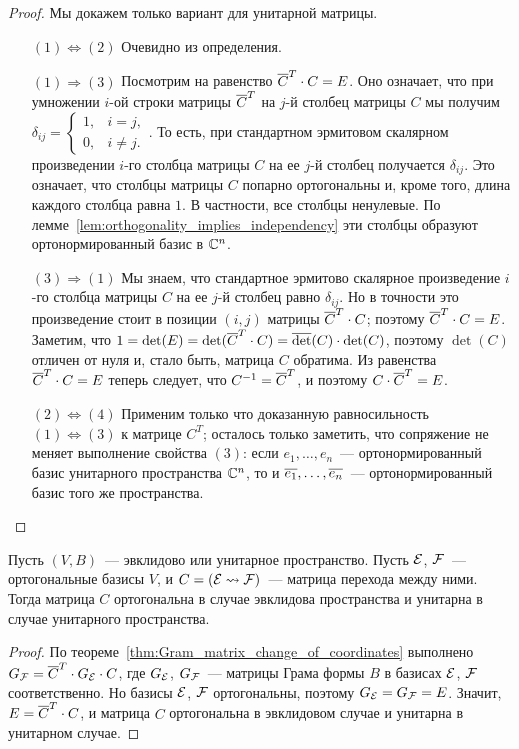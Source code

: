 \begin{proof}
Мы докажем только вариант для унитарной матрицы.
\begin{itemize}
\item[$(1)\Leftrightarrow (2)$] Очевидно из определения.
\item[$(1)\Rightarrow (3)$] Посмотрим на равенство $\overline{C}^T\cdot
  C=E$. Оно означает, что при умножении $i$-ой строки матрицы
  $\overline{C}^T$ на $j$-й столбец матрицы $C$ мы получим
  $\delta_{ij} = \begin{cases}1,&i=j,\\0,&i\neq j.\end{cases}$. То
  есть, при стандартном эрмитовом скалярном произведении $i$-го
  столбца матрицы $C$ на ее $j$-й столбец получается $\delta_{ij}$. Это
  означает, что столбцы матрицы $C$ попарно ортогональны и, кроме того,
  длина каждого столбца равна $1$. В частности, все столбцы
  ненулевые. По лемме~\ref{lem:orthogonality_implies_independency} эти
  столбцы образуют ортонормированный базис в $\mathbb C^n$.
\item[$(3)\Rightarrow (1)$] Мы знаем, что стандартное эрмитово
  скалярное произведение $i$-го столбца матрицы $C$ на ее $j$-й
  столбец равно $\delta_{ij}$. Но в точности это произведение стоит в
  позиции $(i,j)$ матрицы $\overline{C}^T\cdot C$; поэтому $\overline{C}^T\cdot C
  = E$. Заметим, что $1 = \det(E) = \det(\overline{C}^T\cdot C) =
  \overline\det(C)\cdot\det(C)$, поэтому $\det(C)$ отличен от нуля и, стало
  быть, матрица $C$ обратима. Из равенства $\overline{C}^T\cdot C = E$
  теперь следует, что $C^{-1} = \overline{C}^T$, и поэтому $C\cdot\overline{C}^T =
  E$.
\item[$(2)\Leftrightarrow (4)$] Применим только что доказанную
  равносильность $(1)\Leftrightarrow (3)$ к матрице $C^T$; осталось
  только заметить, что сопряжение не меняет выполнение свойства $(3)$:
  если $e_1,\dots,e_n$~--- ортонормированный базис унитарного
  пространства $\mathbb C^n$, то и $\overline{e_1},\dots,\overline{e_n}$~---
  ортонормированный базис того же пространства.
\end{itemize}
\end{proof}

\begin{theorem}
Пусть $(V,B)$~--- эвклидово или унитарное пространство.
Пусть $\mathcal E$, $\mathcal F$~--- ортогональные базисы $V$, и
$C=(\mathcal E\rightsquigarrow\mathcal F)$~--- матрица перехода между ними. Тогда матрица
$C$ ортогональна в случае эвклидова пространства и унитарна в случае
унитарного пространства.
\end{theorem}
\begin{proof}
По теореме~\ref{thm:Gram_matrix_change_of_coordinates} выполнено
$G_{\mathcal F} = \overline{C}^T\cdot G_{\mathcal E}\cdot C$, где
$G_{\mathcal E}$, $G_{\mathcal F}$~--- матрицы Грама формы $B$ в базисах $\mathcal E$,
$\mathcal F$ соответственно. Но базисы $\mathcal E$, $\mathcal F$ ортогональны,
поэтому $G_{\mathcal E} = G_{\mathcal F} = E$. Значит, $E = \overline{C}^T\cdot C$, и
матрица $C$ ортогональна в эвклидовом случае и унитарна в унитарном
случае.
\end{proof}

